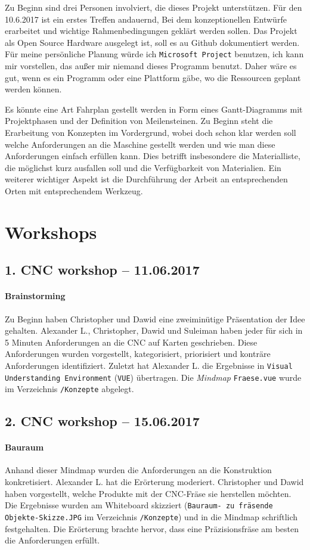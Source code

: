 \documentclass[
	a4paper,
	smallheadings,
	german,
	]
	{scrreprt}
\begin{document}
Zu Beginn sind drei Personen involviert, die dieses Projekt unterstützen.
Für den 10.6.2017 ist ein erstes Treffen andauernd, Bei dem konzeptionellen Entwürfe erarbeitet und wichtige Rahmenbedingungen geklärt werden sollen.
Das Projekt als Open Source Hardware ausgelegt ist, soll es au Github dokumentiert werden.
Für meine persönliche Planung würde ich \texttt{Microsoft Project} benutzen, ich kann mir vorstellen, das außer mir niemand dieses Programm benutzt.
Daher wäre es gut, wenn es ein Programm oder eine Plattform gäbe, wo die Ressourcen geplant werden können.

Es könnte eine Art Fahrplan gestellt werden in Form eines Gantt-Diagramms mit Projektphasen und der Definition von Meilensteinen.
Zu Beginn steht die Erarbeitung von Konzepten im Vordergrund, wobei doch schon klar werden soll welche Anforderungen an die Maschine gestellt werden und wie man diese Anforderungen einfach erfüllen kann.
Dies betrifft insbesondere die Materialliste, die möglichst kurz ausfallen soll und die Verfügbarkeit von Materialien.
Ein weiterer wichtiger Aspekt ist die Durchführung der Arbeit an entsprechenden Orten mit entsprechendem Werkzeug.

\section{Workshops}
\subsection{1. CNC workshop -- 11.06.2017}
\paragraph{Brainstorming}
Zu Beginn haben Christopher und Dawid eine zweiminütige Präsentation der Idee gehalten.
Alexander L., Christopher, Dawid und Suleiman haben jeder für sich in 5 Minuten Anforderungen an die CNC auf Karten geschrieben.
Diese Anforderungen wurden vorgestellt, kategorisiert, priorisiert und konträre Anforderungen identifiziert.
Zuletzt hat Alexander L. die Ergebnisse in \texttt{Visual Understanding Environment} (\texttt{VUE}) übertragen.
Die \textit{Mindmap} \texttt{Fraese.vue} wurde im Verzeichnis \texttt{/Konzepte} abgelegt.

\subsection{2. CNC workshop -- 15.06.2017}
\paragraph{Bauraum}
Anhand dieser Mindmap wurden die Anforderungen an die Konstruktion konkretisiert.
Alexander L. hat die Erörterung moderiert.
Christopher und Dawid haben vorgestellt, welche Produkte mit der CNC-Fräse sie herstellen möchten.
Die Ergebnisse wurden am Whiteboard skizziert (\texttt{Bauraum- zu fräsende Objekte-Skizze.JPG} im Verzeichnis \texttt{/Konzepte}) und in die Mindmap schriftlich festgehalten.
Die Erörterung brachte hervor, dass eine Präzisionsfräse am besten die Anforderungen erfüllt.
\end{document}
